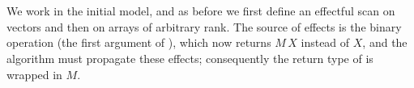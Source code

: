 \begin{code}[hide]%
\>[0][@{}l@{\AgdaIndent{1}}]%
\>[2]\AgdaSpace{}%
\<%
\\
%
\>[2]\AgdaSpace{}%
\AgdaSpace{}%
\AgdaSymbol{(}\AgdaSpace{}%
\AgdaSymbol{)}\AgdaSpace{}%
\AgdaSpace{}%
\AgdaSymbol{(}\AgdaSymbol{)}\<%
\\
%
\>[2]\AgdaSpace{}%
\AgdaSpace{}%
\AgdaSpace{}%
\AgdaSpace{}%
\AgdaSymbol{(}\AgdaSymbol{;}\AgdaSpace{}%
\AgdaSymbol{)}\<%
\\
%
\>[2]\AgdaSpace{}%
\AgdaSpace{}%
\AgdaSpace{}%
\AgdaSymbol{(}\AgdaSymbol{)}\<%
\\
%
\>[2]\AgdaSpace{}%
\<%
\\
\>[2][@{}l@{\AgdaIndent{0}}]%
\>[4]\AgdaSpace{}%
\AgdaSpace{}%
\AgdaSymbol{:}\AgdaSpace{}%
\<%
\\
%
\>[4]\AgdaSpace{}%
\AgdaSpace{}%
\AgdaSymbol{:}\AgdaSpace{}%
\<%
\\
%
\>[4]%
\>[7]\AgdaSymbol{:}\AgdaSpace{}%
\<%
\end{code}
We work in the initial model, and as before we first define an effectful scan
on vectors and then on arrays of arbitrary rank.  The source of effects is the
binary operation (the first argument of ), which now returns $M\,X$
instead of $X$, and the algorithm must propagate these effects; consequently
the return type of  is wrapped in $M$.

